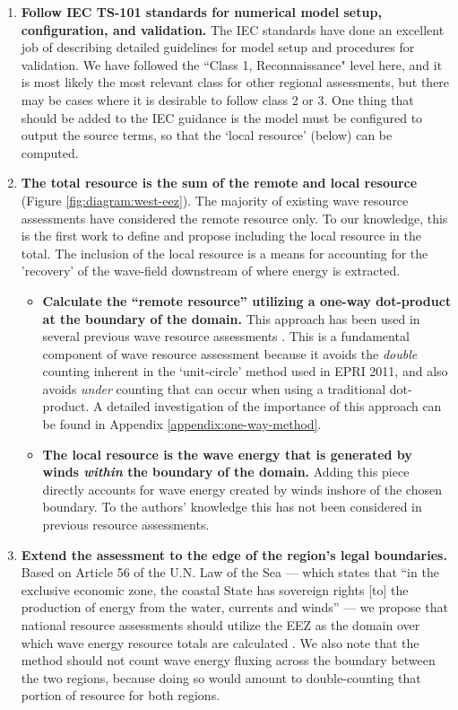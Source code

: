 \begin{enumerate}
\item {\bf Follow IEC TS-101 standards for numerical model setup, configuration, and validation.} The IEC standards have done an excellent job of describing detailed guidelines for model setup and procedures for validation. We have followed the ``Class 1, Reconnaissance" level here, and it is most likely the most relevant class for other regional assessments, but there may be cases where it is desirable to follow class 2 or 3. One thing that should be added to the IEC guidance is the model must be configured to output the source terms, so that the `local resource' (below) can be computed.
\item {\bf The total resource is the sum of the remote and local resource} (Figure \ref{fig:diagram:west-eez}). The majority of existing wave resource assessments have considered the remote resource only. To our knowledge, this is the first work to define and propose including the local resource in the total. The inclusion of the local resource is a means for accounting for the 'recovery' of the wave-field downstream of where energy is extracted.
\begin{itemize}
    \item {\bf Calculate the ``remote resource'' utilizing a one-way dot-product at the boundary of the domain.} This approach has been used in several previous wave resource assessments \citep{gunnQuantifyingGlobalWave2012, hemerRevisedAssessmentAustralia2017}. This is a fundamental component of wave resource assessment because it avoids the {\em double} counting inherent in the `unit-circle' method used in EPRI 2011, and also avoids {\em under} counting that can occur when using a traditional dot-product. A detailed investigation of the importance of this approach can be found in Appendix \ref{appendix:one-way-method}.
    \item {\bf The local resource is the wave energy that is generated by winds \textit{within} the boundary of the domain.} Adding this piece directly accounts for wave energy created by winds inshore of the chosen boundary. To the authors' knowledge this has not been considered in previous resource assessments.
\end{itemize}
\item {\bf Extend the assessment to the edge of the region's legal boundaries.} Based on Article 56 of the U.N. Law of the Sea — which states that ``in the exclusive economic zone, the coastal State has sovereign rights [to] the production of energy from the water, currents and winds'' — we propose that national resource assessments should utilize the EEZ as the domain over which wave energy resource totals are calculated \citep{unitednationsgeneralassemblyConventionLawSea1982}. We also note that the method should not count wave energy fluxing across the boundary between the two regions, because doing so would amount to double-counting that portion of resource for both regions.
\end{enumerate}

